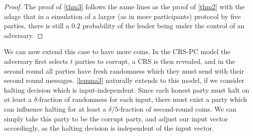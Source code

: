 \begin{proof}The proof of \cref{thm3} follows the same lines as the proof of \cref{thm2} with the adage that in a simulation of a larger (as in more participants) protocol by five parties, there is still a $0.2$ probability of the leader being under the control of an adversary.
\end{proof}
We can now extend this case to have more coins. In the CRS-PC model the adversary first selects $t$ parties to corrupt, a CRS is then revealed, and in the second round all parties have fresh randomness which they must send with their second round messages. \cref{lemma3} naturally extends to this model, if we consider halting decision which is input-independent. Since each honest party must halt on at least a $\delta$-fraction of randomness for each input, there must exist a party which can influence halting for at least a $\delta/5$-fraction of second-round coins. We can simply take this party to be the corrupt party, and adjust our input vector accordingly, as the halting decision is independent of the input vector.


